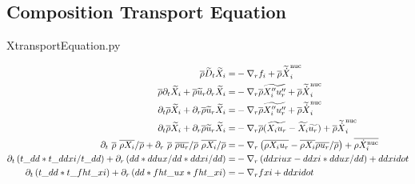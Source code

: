 \documentclass[11pt,paper=a4]{report}
\newcommand{\eht}{\overline}
\newcommand{\fav}{\widetilde}
\def\erho{\eht{\rho}}
\begin{document}
\subsection{Composition Transport Equation}
\label{sect:xtranseq}

XtransportEquation.py

\begin{align}
\erho\fav{D}_t \fav{X}_i = & -\nabla_r f_i + \erho \fav{\dot{X}}_i^{\rm nuc} \\
\erho\partial_t \fav{X}_i + \erho \fav{u}_r \partial_r \fav{X}_i = & -\nabla_r \erho \fav{X''_i u''_r} +  \erho \fav{\dot{X}}_i^{\rm nuc} \nonumber \\
\partial_t \erho \fav{X}_i + \partial_r \erho \fav{u}_r \fav{X}_i = & -\nabla_r \erho \fav{X''_i u''_r} +  \erho \fav{\dot{X}}_i^{\rm nuc} \nonumber \\
\partial_t \erho \fav{X}_i + \partial_r \erho \fav{u}_r \fav{X}_i = & -\nabla_r \erho (\fav{X_i u_r} - \fav{X_i}\fav{u_r}) +  \erho \fav{\dot{X}}_i^{\rm nuc} \nonumber \\
\partial_t \ \erho \ \eht{\rho X_i}/\eht{\rho} + \partial_r \ \erho \ \eht{\rho u_r}/\eht{\rho} \ \eht{\rho X_i}/\eht{\rho} = & -\nabla_r \left(\eht{\rho X_i u_r} - \eht{\rho X_i}\eht{\rho u_r}/\eht{\rho} \right) +  \eht{\rho \dot{X}_i^{\rm nuc}} \nonumber \\
\partial_t \left( t\_dd * t\_ddxi/t\_dd \right) + \partial_r \left( dd * ddux/dd * ddxi/dd \right) = & -\nabla_r \left(ddxiux - ddxi*ddux/dd  \right) + ddxidot \nonumber \\
\partial_t \left( t\_dd * t\_fht\_xi \right) + \partial_r \left( dd * fht\_ux * fht\_xi \right) = & -\nabla_r fxi + ddxidot \nonumber
\end{align}


\end{document}
